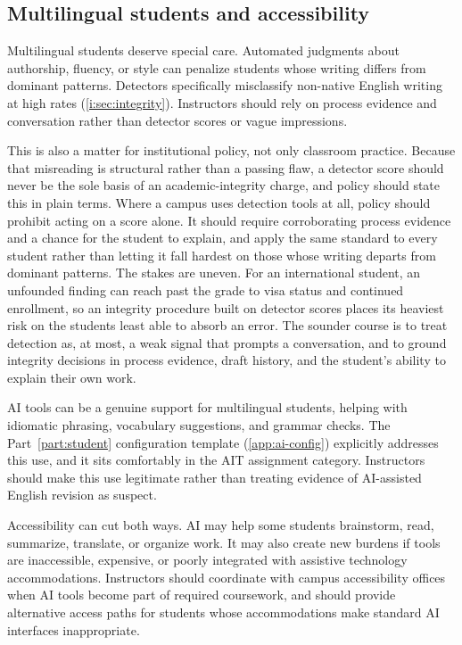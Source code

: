 \documentclass{SIAMbook2023}
\begin{document}
\subsection{Multilingual students and accessibility}
\label{i:subsec:multilingual-accessibility}%

Multilingual students deserve special care. Automated judgments about authorship, fluency, or style can penalize students whose writing differs from dominant patterns. Detectors specifically misclassify non-native English writing at high rates (\cref{i:sec:integrity}). Instructors should rely on process evidence and conversation rather than detector scores or vague impressions.

This is also a matter for institutional policy, not only classroom practice. Because that misreading is structural rather than a passing flaw, a detector score should never be the sole basis of an academic-integrity charge, and policy should state this in plain terms. Where a campus uses detection tools at all, policy should prohibit acting on a score alone. It should require corroborating process evidence and a chance for the student to explain, and apply the same standard to every student rather than letting it fall hardest on those whose writing departs from dominant patterns. The stakes are uneven. For an international student, an unfounded finding can reach past the grade to visa status and continued enrollment, so an integrity procedure built on detector scores places its heaviest risk on the students least able to absorb an error. The sounder course is to treat detection as, at most, a weak signal that prompts a conversation, and to ground integrity decisions in process evidence, draft history, and the student's ability to explain their own work.

AI tools can be a genuine support for multilingual students, helping with idiomatic phrasing, vocabulary suggestions, and grammar checks. The Part~\ref{part:student} configuration template (\cref{app:ai-config}) explicitly addresses this use, and it sits comfortably in the AIT assignment category. Instructors should make this use legitimate rather than treating evidence of AI-assisted English revision as suspect.

Accessibility can cut both ways. AI may help some students brainstorm, read, summarize, translate, or organize work. It may also create new burdens if tools are inaccessible, expensive, or poorly integrated with assistive technology accommodations. Instructors should coordinate with campus accessibility offices when AI tools become part of required coursework, and should provide alternative access paths for students whose accommodations make standard AI interfaces inappropriate.
\end{document}
